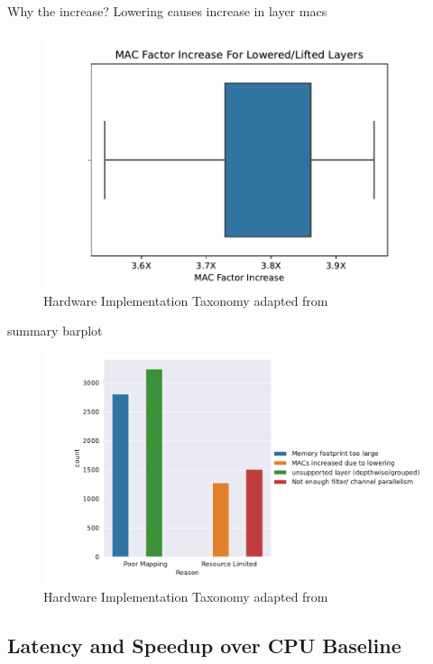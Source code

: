 Why the increase?
Lowering causes increase in layer macs
\begin{figure}[ht]
    \centering
    \includegraphics[scale=0.58]{Plots/utilization/macs.pdf}
    \caption{Hardware Implementation Taxonomy adapted from \cite{maestro}}
    \label{fig:hw_taxonomy}
\end{figure}

summary barplot

\begin{figure}[ht]
    \centering
    \includegraphics[scale=0.58]{Plots/utilization/summary.pdf}
    \caption{Hardware Implementation Taxonomy adapted from \cite{maestro}}
    \label{fig:hw_taxonomy}
\end{figure}

\subsection{Latency and Speedup over CPU Baseline}
\label{chap:hero:sim_platform:cigar_side}


